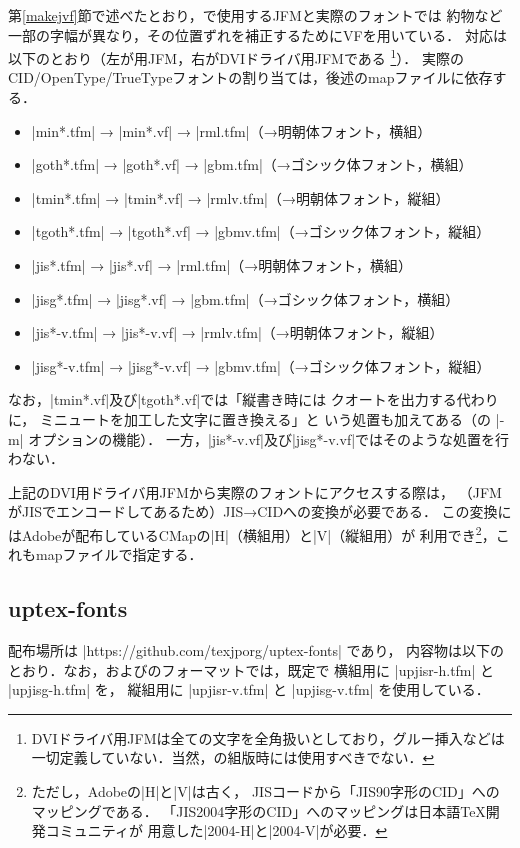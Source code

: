 \documentclass[a4paper,11pt,nomag]{jsarticle}
\begin{document}
第\ref{makejvf}節で述べたとおり，\pTeX で使用するJFMと実際のフォントでは
約物など一部の字幅が異なり，その位置ずれを補正するためにVFを用いている．
対応は以下のとおり（左が\pTeX 用JFM，右がDVIドライバ用JFMである
\footnote{DVIドライバ用JFMは全ての文字を全角扱いとしており，グルー挿入などは
一切定義していない．当然，\pTeX の組版時には使用すべきでない．}）．
実際のCID/OpenType/TrueTypeフォントの割り当ては，後述のmapファイルに依存する．
\begin{itemize}
  \item |min*.tfm| → |min*.vf| → |rml.tfm|（→明朝体フォント，横組）
  \item |goth*.tfm| → |goth*.vf| → |gbm.tfm|（→ゴシック体フォント，横組）
  \item |tmin*.tfm| → |tmin*.vf| → |rmlv.tfm|（→明朝体フォント，縦組）
  \item |tgoth*.tfm| → |tgoth*.vf| → |gbmv.tfm|（→ゴシック体フォント，縦組）
  \item |jis*.tfm| → |jis*.vf| → |rml.tfm|（→明朝体フォント，横組）
  \item |jisg*.tfm| → |jisg*.vf| → |gbm.tfm|（→ゴシック体フォント，横組）
  \item |jis*-v.tfm| → |jis*-v.vf| → |rmlv.tfm|（→明朝体フォント，縦組）
  \item |jisg*-v.tfm| → |jisg*-v.vf| → |gbmv.tfm|（→ゴシック体フォント，縦組）
\end{itemize}
なお，|tmin*.vf|及び|tgoth*.vf|では「縦書き時には
クオートを出力する代わりに，
ミニュートを加工した文字に置き換える」と
いう処置も加えてある（の |-m| オプションの機能）．
一方，|jis*-v.vf|及び|jisg*-v.vf|ではそのような処置を行わない．

上記のDVI用ドライバ用JFMから実際のフォントにアクセスする際は，
（JFMがJISでエンコードしてあるため）JIS→CIDへの変換が必要である．
この変換にはAdobeが配布しているCMapの|H|（横組用）と|V|（縦組用）が
利用でき\footnote{ただし，Adobeの|H|と|V|は古く，
JISコードから「JIS90字形のCID」へのマッピングである．
「JIS2004字形のCID」へのマッピングは日本語\TeX 開発コミュニティが
用意した|2004-H|と|2004-V|が必要．}，これもmapファイルで指定する．

\subsection{uptex-fonts}

配布場所は |https://github.com/texjporg/uptex-fonts| であり，
内容物は以下のとおり．なお，\upTeX および\upLaTeX のフォーマットでは，既定で
横組用に |upjisr-h.tfm| と |upjisg-h.tfm| を，
縦組用に |upjisr-v.tfm| と |upjisg-v.tfm| を使用している．
\end{document}
